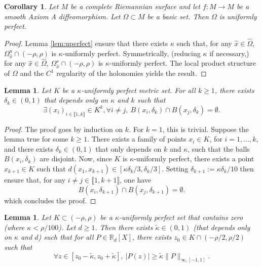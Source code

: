 \documentclass[a4paper]{article}
\newtheorem{corollary}[theorem]{Corollary}
\newtheorem{lemma}[theorem]{Lemma}
\theoremstyle{definition}
\begin{document}
\begin{corollary}
Let $M$ be a complete Riemannian surface and let $f:M \rightarrow M$ be a smooth Axiom A diffeomorphism. Let $\Omega \subset M$ be a basic set. Then $\Omega$ is uniformly perfect.
\end{corollary}

\begin{proof}
Lemma \ref{lem:uperfect} ensure that there exists $\kappa$ such that, for any ${\widehat{x}} \in \widehat{\Omega}$, $\Omega_{\widehat{x}}^u \cap (-\rho,\rho)$ is $\kappa$-uniformly perfect. Symmetrically, (reducing $\kappa$ if necessary,) for any ${\widehat{x}} \in \widehat{\Omega}$, $\Omega_{\widehat{x}}^s \cap (-\rho,\rho)$ is $\kappa$-uniformly perfect. The local product structure of $\Omega$ and the $C^{1}$ regularity of the holonomies yields the result.
\end{proof}

\begin{lemma}\label{lem:cutperfect}
Let $K$ be a $\kappa$-uniformly perfect metric set. For all $k \geq 1$, there exists $\delta_{k} \in (0,1)$ that depends only on $\kappa$ and $k$ such that 
$$ \exists (x_i)_{i \in \llbracket 1, k \rrbracket} \in K^k,  \forall i \neq j, \ B(x_i,\delta_k) \cap B(x_j,\delta_k) = \emptyset. $$
\end{lemma}

\begin{proof}
The proof goes by induction on $k$. For $k=1$, this is trivial. Suppose the lemma true for some $k \geq 1$. There exists a family of points $x_i \in K$, for $i = 1, \dots ,k$, and there exists $\delta_{k} \in (0,1)$ that only depends on $k$ and $\kappa$, such that the balls $ B(x_i,\delta_k) $ are disjoint. Now, since $K$ is $\kappa$-uniformly perfect, there exists a point $x_{k+1} \in K$ such that $d(x_1,x_{k+1}) \in [\kappa \delta_k/3, \delta_k/3]$.
Setting $\delta_{k+1} := \kappa \delta_k/10$ then ensure that, for any $i \neq j \in \llbracket 1,k+1 \rrbracket$, one have
$$ B(x_i,\delta_{k+1}) \cap B(x_j,\delta_{k+1}) = \emptyset. $$
which concludes the proof.
\end{proof}




\begin{lemma}\label{lem:prenorm}
Let $K \subset (-\rho,\rho)$ be a $\kappa$-uniformly perfect set that contains zero (where $\kappa< \rho/100$). Let $d \geq 1$. Then there exists $\tilde{\kappa} \in (0,1)$ (that depends only on $\kappa$ and $d$) such that for all $P \in \mathbb{R}_d[X]$, there exists $z_0 \in K \cap (-\rho/2,\rho/2)$ such that
$$ \forall z \in [z_0-\tilde{\kappa},z_0+\tilde{\kappa}], \ |P(z)| \geq \tilde{\kappa} \|P\|_{\infty,[-1,1]}. $$
\end{lemma}
\end{document}
